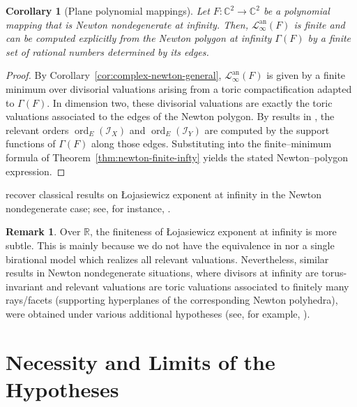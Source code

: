 \documentclass[12pt]{amsart}
\newcommand{\RR}{\mathbb{R}}
\newcommand{\CC}{\mathbb{C}}
\newcommand{\ord}{\operatorname{\mathrm{ord}}}
\newcommand{\Loj}{\mathcal{L}} %
\theoremstyle{plain}
\newtheorem{corollary}[theorem]{Corollary}
\theoremstyle{definition}
\newtheorem{remark}[theorem]{Remark}
\numberwithin{equation}{section}
\begin{document}
\begin{corollary}[Plane polynomial mappings]\label{cor:plane-mapping-recovery}
	Let $F : \CC^2 \to \CC^2$ be a polynomial mapping that is Newton nondegenerate at infinity.
	Then, $\Loj^{\text{an}}_\infty(F)$ is finite and can be computed explicitly from the Newton polygon at infinity
	$\Gamma(F)$ by a finite set of rational numbers determined by its edges.
\end{corollary}

\begin{proof}
	By Corollary~\ref{cor:complex-newton-general}, $\Loj^{\text{an}}_\infty(F)$ is given by a finite minimum over
	divisorial valuations arising from a toric compactification adapted to $\Gamma(F)$.
	In dimension two, these divisorial valuations are exactly the toric valuations associated to the
	edges of the Newton polygon. By results in ,
	the relevant orders $\ord_E(\mathscr I_X)$ and $\ord_E(\mathscr I_Y)$ are computed by the support
	functions of $\Gamma(F)$ along those edges. Substituting into the finite--minimum formula of
	Theorem~\ref{thm:newton-finite-infty} yields the stated Newton--polygon expression.
\end{proof}

 recover classical results on \L{}ojasiewicz exponent at infinity in the Newton nondegenerate case; see, for instance, \cite{Ploski}.

\begin{remark}\label{rem:finite-max-infinity}
	Over $\RR$, the finiteness of \L{}ojasiewicz exponent at infinity is more subtle. This is mainly because we do not have the equivalence in  nor a single birational model which realizes all relevant valuations. Nevertheless, similar results in Newton nondegenerate situations, where divisors at infinity are torus-invariant and relevant valuations are toric valuations associated to finitely many rays/facets (supporting hyperplanes of the corresponding Newton polyhedra), were obtained under various additional hypotheses (see, for example, \cite{VuiThao,OleRoz,Son2008}).
\end{remark}



\part{Necessity and Limits of the Hypotheses} \label{part:necessity}
\end{document}

